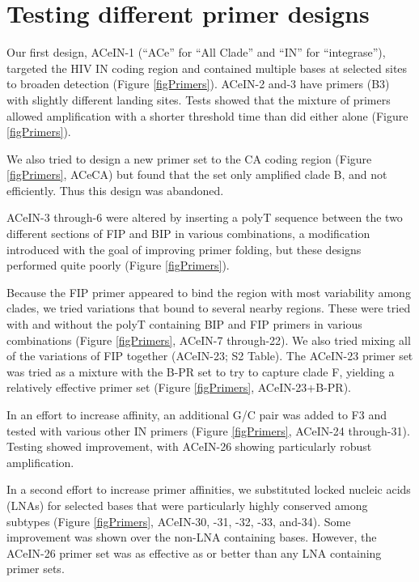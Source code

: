\documentclass[../sherrill-Mix_thesis.tex]{subfiles}
\begin{document}
		\section{Testing different primer designs}
			Our first design, ACeIN-1 (``ACe'' for ``All Clade'' and ``IN'' for ``integrase''), targeted the HIV IN coding region and contained multiple bases at selected sites to broaden detection (Figure \ref{figPrimers}). ACeIN-2 and-3 have primers (B3) with slightly different landing sites. Tests showed that the mixture of primers allowed amplification with a shorter threshold time than did either alone (Figure \ref{figPrimers}).

			We also tried to design a new primer set to the CA coding region (Figure \ref{figPrimers}, ACeCA) but found that the set only amplified clade B, and not efficiently. Thus this design was abandoned.

			ACeIN-3 through-6 were altered by inserting a polyT sequence between the two different sections of FIP and BIP in various combinations, a modification introduced with the goal of improving primer folding, but these designs performed quite poorly (Figure \ref{figPrimers}).

			Because the FIP primer appeared to bind the region with most variability among clades, we tried variations that bound to several nearby regions. These were tried with and without the polyT containing BIP and FIP primers in various combinations (Figure \ref{figPrimers}, ACeIN-7 through-22). We also tried mixing all of the variations of FIP together (ACeIN-23; S2 Table). The ACeIN-23 primer set was tried as a mixture with the B-PR set to try to capture clade F, yielding a relatively effective primer set (Figure \ref{figPrimers}, ACeIN-23+B-PR).

			In an effort to increase affinity, an additional G/C pair was added to F3 and tested with various other IN primers (Figure \ref{figPrimers}, ACeIN-24 through-31). Testing showed improvement, with ACeIN-26 showing particularly robust amplification.

			In a second effort to increase primer affinities, we substituted locked nucleic acids (LNAs) for selected bases that were particularly highly conserved among subtypes (Figure \ref{figPrimers}, ACeIN-30, -31, -32, -33, and-34). Some improvement was shown over the non-LNA containing bases. However, the ACeIN-26 primer set was as effective as or better than any LNA containing primer sets.
\end{document}
